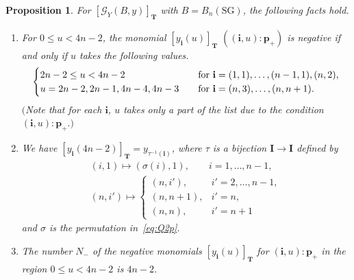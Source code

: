\documentclass[pdftex]{sigma}
\numberwithin{equation}{section}
\newtheorem{Proposition}[Theorem]{Proposition}
\theoremstyle{definition}
\begin{document}
\begin{Proposition}
\label{prop:lev2}
 For
$[\mathcal{G}_Y(B,y)]_{\mathbf{T}}$
with $B=B_{n}(\mathrm{SG})$, the following facts hold.

\begin{enumerate}\itemsep=0pt
\item[$(i)$]  For $0 \le u < 4n-2$,
the  monomial $[y_{\mathbf{i}}(u)]_{\mathbf{T}}$
$((\mathbf{i},u):\mathbf{p}_+)$
is negative if and only if $u$ takes the following values.
\[
\begin{cases}
2n-2 \leq u < 4n-2 &
\quad\mbox{\rm for $\mathbf{i}=(1,1),\dots,(n-1,1),(n,2)$},\\
u=2n-2,2n-1, 4n-4, 4n-3 &
\quad\mbox{\rm for $\mathbf{i}=(n,3),\dots,(n,n+1)$}.
\end{cases}
\]
$($Note that for each $\mathbf{i}$, $u$ takes only a part
of the list due to the condition $(\mathbf{i},u):\mathbf{p}_+.)$
\item[$(ii)$]
 We have $[y_{\mathbf{i}}(4n-2)]_{\mathbf{T}}
=y_{\tau^{-1}(\mathbf{i})}$,
where $\tau$ is a bijection $\mathbf{I} \rightarrow
\mathbf{I}$ defined by
\begin{gather*}
(i,1)   \mapsto (\sigma(i),1),
\qquad i=1,\dots,n-1,\\
(n,i')   \mapsto
\begin{cases}
(n,i'),& i'=2,\dots,n-1,\\
(n,n+1),& i'=n,\\
(n,n),& i'=n+1
\end{cases}
\end{gather*}
and $\sigma$ is the permutation in~\eqref{eq:Q2p}.

\item[$(iii)$] The number $N_-$ of the negative monomials
$[y_{\mathbf{i}}(u)]_{\mathbf{T}}$ for $(\mathbf{i},u):\mathbf{p}_+$
in the region $0\leq u < 4n-2$ is $4n-2$.
\end{enumerate}
\end{Proposition}
\end{document}
